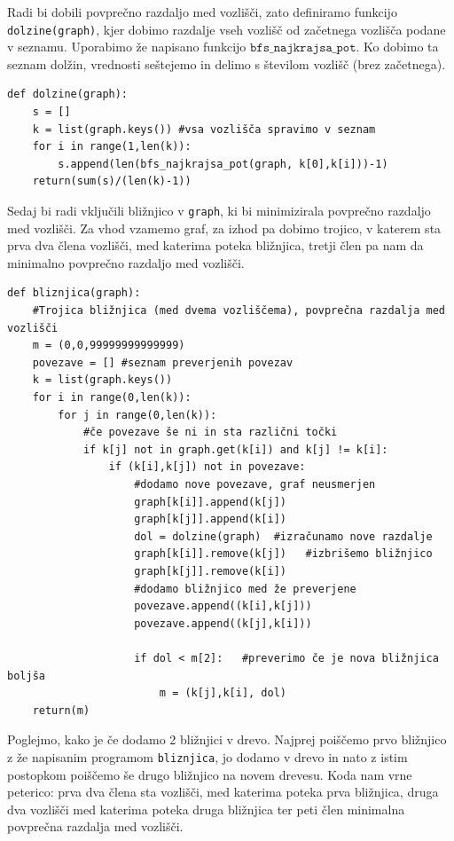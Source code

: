 \documentclass[a4paper,10pt]{article}
\begin{document}
Radi bi dobili povprečno razdaljo med vozlišči, zato definiramo funkcijo \texttt{dolzine(graph)}, kjer dobimo razdalje vseh vozlišč od začetnega vozlišča  podane v seznamu. Uporabimo že napisano funkcijo  $\texttt{bfs\_najkrajsa\_pot}$.  Ko dobimo ta seznam dolžin, vrednosti seštejemo in delimo s številom vozlišč (brez začetnega).

\begin{verbatim}
def dolzine(graph):
    s = []
    k = list(graph.keys()) #vsa vozlišča spravimo v seznam
    for i in range(1,len(k)):
        s.append(len(bfs_najkrajsa_pot(graph, k[0],k[i]))-1)
    return(sum(s)/(len(k)-1))
\end{verbatim}

Sedaj bi radi vključili bližnjico v \texttt{graph}, ki bi minimizirala povprečno razdaljo med vozlišči. Za vhod vzamemo graf, za izhod pa dobimo trojico, v katerem sta prva dva člena vozlišči, med katerima poteka bližnjica, tretji člen pa nam da minimalno povprečno razdaljo med vozlišči.

\begin{verbatim}
def bliznjica(graph):
    #Trojica bližnjica (med dvema vozliščema), povprečna razdalja med vozlišči
    m = (0,0,99999999999999)
    povezave = [] #seznam preverjenih povezav
    k = list(graph.keys())
    for i in range(0,len(k)):
        for j in range(0,len(k)):
            #če povezave še ni in sta različni točki
            if k[j] not in graph.get(k[i]) and k[j] != k[i]:
                if (k[i],k[j]) not in povezave:
                    #dodamo nove povezave, graf neusmerjen
                    graph[k[i]].append(k[j])
                    graph[k[j]].append(k[i])
                    dol = dolzine(graph)  #izračunamo nove razdalje
                    graph[k[i]].remove(k[j])   #izbrišemo bližnjico
                    graph[k[j]].remove(k[i])
                    #dodamo bližnjico med že preverjene
                    povezave.append((k[i],k[j]))
                    povezave.append((k[j],k[i]))

                    if dol < m[2]:   #preverimo če je nova bližnjica boljša
                        m = (k[j],k[i], dol)
    return(m)
\end{verbatim}

Poglejmo, kako je če dodamo 2 bližnjici v drevo. Najprej poiščemo prvo bližnjico z že napisanim programom \texttt{bliznjica}, jo dodamo v drevo in nato z istim postopkom poiščemo še drugo bližnjico na novem drevesu. Koda nam vrne peterico: prva dva člena sta vozlišči, med katerima poteka prva bližnjica, druga dva vozlišči med katerima poteka druga bližnjica ter peti člen minimalna povprečna razdalja med vozlišči. 
\end{document}
